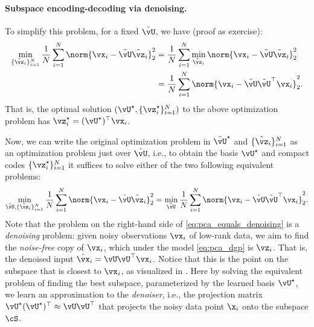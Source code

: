 \documentclass[../../book-main.tex]{subfiles}
\begin{document}
\paragraph{Subspace encoding-decoding via denoising.}
To simplify this problem, for a fixed \(\tilde{\vU}\), we have (proof as exercise):
\begin{align}
    \min_{\{\tilde{\vz}_{i}\}_{i = 1}^{N}}\frac{1}{N}\sum_{i = 1}^{N}\norm{\vx_{i} - \tilde{\vU}\tilde{\vz}_{i}}_{2}^{2} 
    &= \frac{1}{N}\sum_{i = 1}^{N}\min_{\tilde{\vz}_{i}}\norm{\vx_{i} - \tilde{\vU}\tilde{\vz}_{i}}_{2}^{2} \\
    &= \frac{1}{N}\sum_{i = 1}^{N}\norm{\vx_{i} - \tilde{\vU}\tilde{\vU}^{\top}\vx_{i}}_{2}^{2}. 
\end{align}
That is, the optimal solution \((\vU^{\star}, \{\vz_{i}^{\star}\}_{i = 1}^{N})\)
to the above optimization problem has $\vz_i^{\star} = (\vU^{\star})^\top\vx_i$.

Now, we can write the original optimization problem in \(\tilde{\vU}^{\star}\)
and \(\{\tilde{\vz}_{i}\}_{i = 1}^{N}\) as an optimization problem just over
\(\tilde{\vU}\), i.e., to obtain the basis \(\vU^{\star}\) and compact codes
\(\{\vz_{i}^{\star}\}_{i = 1}^{N}\) it suffices to solve either of the two following equivalent problems:
\begin{equation}\label{eq:pca_equals_denoising}
    \min_{\tilde{\vU}, \{\tilde{\vz}_{i}\}_{i = 1}^{N}}\frac{1}{N}\sum_{i = 1}^{N}\norm{\vx_{i} - \tilde{\vU}\tilde{\vz}_{i}}_{2}^{2} = \min_{\tilde{\vU}}\frac{1}{N}\sum_{i = 1}^{N}\norm{\vx_{i} - \tilde{\vU}\tilde{\vU}^{\top}\vx_{i}}_{2}^{2}.
\end{equation}
Note that the problem on the right-hand side of \eqref{eq:pca_equals_denoising}
is a \textit{denoising} problem: given noisy observations \(\vx_{i}\) of
low-rank data, we aim to find the \textit{noise-free} copy of \(\vx_{i}\), which
under the model \eqref{eq:pca_dgp} is $\vz_{i}$. That is, the denoised input
$\hat{\vx}_i = \vU\vU^\top \vx_i$. Notice that this is the point on the subspace
that is closest to $\vx_i$, as visualized in . Here by
solving the equivalent problem of finding the best subspace, parameterized by
the learned basis \(\vU^{\star}\), we learn an approximation to the
\textit{denoiser}, i.e., the projection matrix \(\vU^{\star}(\vU^{\star})^{\top} \approx \vU\vU^{\top}\) that projects the noisy data point $\x_i$ onto the subspace \(\cS\). %
\end{document}
